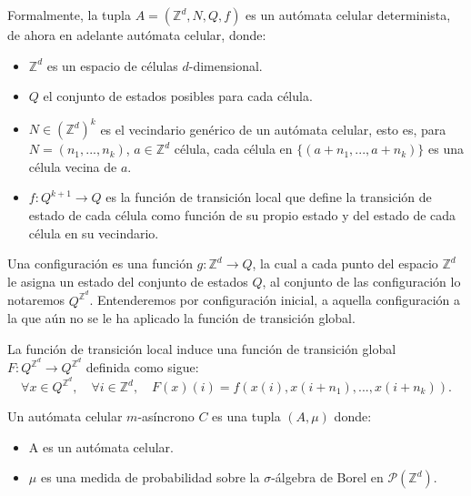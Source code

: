 \documentclass[../proyecto.tex]{memoir}
\begin{document}
\begin{defi}
Formalmente, la tupla $A=(\mathds{Z}^{d}, N, Q, f)$ es un autómata celular determinista, de ahora en adelante autómata celular, donde:

\begin{itemize}
\item $\mathds{Z} ^{d}$ es un espacio de células $d$-dimensional.
\item $Q$ el conjunto de estados posibles para cada célula.
\item $N \in (\mathds{Z}^{d})^{k}$ es el vecindario genérico de un autómata celular, esto es, para $N=(n_{1},...,n_{k})$, $a \in \mathds{Z} ^{d}$ célula, cada célula en $\{(a+n_{1},...,a+n_{k})\}$ es una célula vecina de $a$.
\item $f:Q^{k+1} \rightarrow Q$ es la función de transición local que define la transición de estado de cada célula como función de su propio estado y del estado de cada célula en su vecindario. 
\end{itemize}

\end{defi}

\begin{defi}
Una configuración es una función $g: \mathds{Z}^{d} \rightarrow Q$, la cual a cada punto del espacio $\mathds{Z}^{d}$ le asigna un estado del conjunto de estados $Q$, al conjunto de las configuración lo notaremos $Q^{\mathds{Z}^{d}}$. Entenderemos por configuración inicial, a aquella configuración a la que aún no se le ha aplicado la función de transición global.
\end{defi}

\begin{defi}
La función de transición local induce una función de transición global $F:Q^{\mathds{Z}^{d}} \rightarrow Q^{\mathds{Z}^{d}}$ definida como sigue:
$$
\forall x \in Q^{\mathds{Z}^{d}}, \quad \forall i \in \mathds{Z}^{d}, \quad F(x)(i) = f(x(i),x(i+n_{1}),...,x(i+n_{k})).
$$
\end{defi}

\begin{defi}
Un autómata celular $m$-asíncrono $C$ es una tupla $(A, \mu)$ donde: 
\begin{itemize}
\item A es un autómata celular.
\item $\mu$ es una medida de probabilidad sobre la $\sigma$-álgebra de Borel en $\mathcal{P}(\mathds{Z}^{d})$.
\end{itemize} 
\end{defi}
\end{document}
